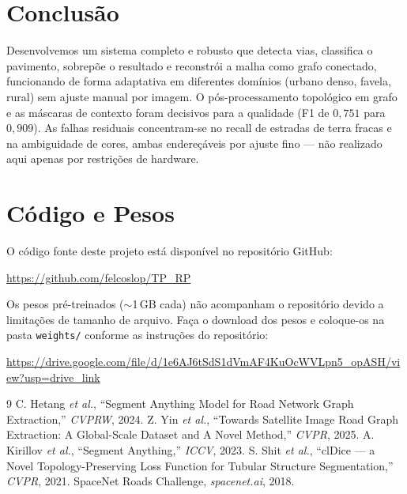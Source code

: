 \documentclass[12pt]{article}
\begin{document}
\section{Conclusão}

Desenvolvemos um sistema completo e robusto que detecta vias, classifica o
pavimento, sobrepõe o resultado e reconstrói a malha como grafo conectado,
funcionando de forma adaptativa em diferentes domínios (urbano denso, favela,
rural) sem ajuste manual por imagem. O pós-processamento topológico em
grafo e as máscaras de contexto foram decisivos para a qualidade
(F1 de $0{,}751$ para $0{,}909$). As falhas residuais concentram-se no
recall de estradas de terra fracas e na ambiguidade de cores, ambas
endereçáveis por ajuste fino --- não realizado aqui apenas por
restrições de hardware.

\section*{Código e Pesos}

O código fonte deste projeto está disponível no repositório GitHub:
\begin{center}
\url{https://github.com/felcoslop/TP_RP}
\end{center}

Os pesos pré-treinados ($\sim$1\,GB cada) não acompanham o repositório devido a limitações de tamanho de arquivo. Faça o download dos pesos e coloque-os na pasta \texttt{weights/} conforme as instruções do repositório:
\begin{center}
\url{https://drive.google.com/file/d/1e6AJ6tSdS1dVmAF4KuOcWVLpn5_opASH/view?usp=drive_link}
\end{center}


\begin{thebibliography}{9}
 C. Hetang \textit{et al.}, ``Segment Anything Model for Road Network Graph Extraction,'' \textit{CVPRW}, 2024.
 Z. Yin \textit{et al.}, ``Towards Satellite Image Road Graph Extraction: A Global-Scale Dataset and A Novel Method,'' \textit{CVPR}, 2025.
 A. Kirillov \textit{et al.}, ``Segment Anything,'' \textit{ICCV}, 2023.
 S. Shit \textit{et al.}, ``clDice --- a Novel Topology-Preserving Loss Function for Tubular Structure Segmentation,'' \textit{CVPR}, 2021.
 SpaceNet Roads Challenge, \textit{spacenet.ai}, 2018.
\end{thebibliography}
\end{document}
